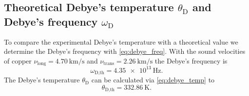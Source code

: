 \subsection{Theoretical Debye's temperature \texorpdfstring{$\theta_\text{D}$}{theta} and Debye's frequency \texorpdfstring{$\omega_\text{D}$}{theta}}
To compare the experimental Debye's temperature with a theoretical value we determine the Debye's frequency with \autoref{eq:debye_freq}.
With the sound velocities of copper $\nu_\text{long} = \qty{4.70}{\kilo\meter\per\second}$ and $\nu_\text{trans} = \qty{2.26}{\kilo\meter\per\second}$ the Debye's frequency is
\begin{equation}
    \omega_\text{D,th} = \qty{4.35e13}{\hertz}.
\end{equation}
The Debye's temperature $\theta_\text{D}$ can be calculated via \autoref{eq:debye_temp} to
\begin{equation}
    \theta_\text{D,th} = \qty{332.86}{\kelvin}.
\end{equation}
